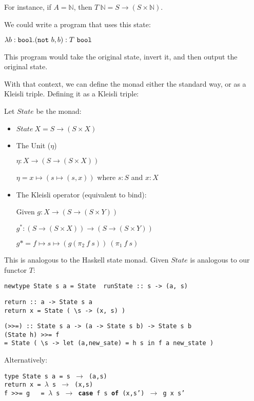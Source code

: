 \documentclass[../main.tex]{subfiles}
\begin{document}
For instance, if $A = \mathbb{N}$, then $T~\mathbb{N} = S \rightarrow (S \times \mathbb{N})$.

We could write a program that uses this state:

\qquad $\lambda b : {\tt bool} . ({\tt not}~b,b) : T~{\tt bool}$

This program would take the original state, invert it, and then output the original state.

With that context, we can define the monad either the standard way, or as a Kleisli triple. Defining it as a Kleisli triple:

Let $State$ be the monad:
\begin{itemize}
\item $State~X = S \rightarrow (S \times X)$
\item The Unit ($\eta$)

$\eta : X \rightarrow (S \rightarrow (S \times X))$

$\eta = x \mapsto (s \mapsto (s,x))$ where $s : S$ and $x : X$

\item The Kleisli operator (equivalent to bind):

Given $g : X \rightarrow (S \rightarrow (S \times Y))$

$g^* : (S \rightarrow (S \times X)) \rightarrow (S \rightarrow (S \times Y))$

$g* = f \mapsto s \mapsto (g (\pi_{2}~ f~ s))~ (\pi_{1} ~f~ s)$

\end{itemize}

This is analogous to the Haskell state monad. Given $State$ is analogous to our functor $T$:

{\tt newtype State s a = State { runState :: s -> (a, s) }}

{\tt return :: a -> State s a \\
return x = State ( \textbackslash s -> (x, s) )}

{\tt (>>=) :: State s a -> (a -> State s b) -> State s b \\
(State h) >>= f \\
= State ( \textbackslash s -> let (a,new_sate) = h s in f a new_state )
}

Alternatively:

{\tt type State s a = s $\rightarrow$ (a,s)\\
return x = $\lambda$ s $\rightarrow$ (x,s)\\
f >>= g  ~~= $\lambda$ s $\rightarrow$ \textbf{case} f s \textbf{of} (x,s') $\rightarrow$ g x s' }
\end{document}
